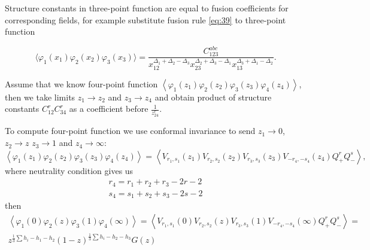 \documentclass[12pt]{article}
\begin{document}
Structure constants in three-point function are equal to fusion coefficients for corresponding
fields, for example substitute fusion rule \eqref{eq:39} to three-point function

  \begin{equation}
    \label{eq:56}
    \langle
    \varphi_{1}(x_{1})\varphi_{2}(x_{2})\varphi_{3}(x_{3})\rangle=\frac{C^{abc}_{123}}{x_{12}^{\Delta_{1}+\Delta_{2}-\Delta_{3}}
      x_{23}^{\Delta_{2}+\Delta_{3}-\Delta_{1}}x_{13}^{\Delta_{3}+\Delta_{1}-\Delta_{2}}}.     
  \end{equation}


Assume that we know four-point function
$\left<\varphi_{1}(z_{1})\varphi_{2}(z_{2})\varphi_{3}(z_{3})\varphi_{4}(z_{4})\right>$, then we
take limits $z_{1}\to z_{2}$ and $z_{3}\to z_{4}$ and obtain product of structure constants
$C_{12}^{r}C_{34}^{r}$ as a coefficient before $\frac{1}{z_{24}^{r}}$.

To compute four-point function we use conformal invariance to send $z_{1}\to 0$, $z_{2}\to z$
$z_{3}\to 1$ and $z_{4}\to \infty$:
\begin{equation}
  \label{eq:58}
  \left<\varphi_{1}(z_{1})\varphi_{2}(z_{2})\varphi_{3}(z_{3})\varphi_{4}(z_{4})\right>=\left<
    V_{r_{1},s_{1}}(z_{1}) V_{r_{2},s_{2}}(z_{2}) V_{r_{3},s_{3}}(z_{3}) V_{-r_{4},-s_{4}}(z_{4})
    Q_{+}^{r} Q_{-}^{s}\right>,
\end{equation}
where neutrality condition gives us
\begin{equation}
  \label{eq:59}
  \begin{array}{c}
    r_{4}=r_{1}+r_{2}+r_{3}-2r-2\\
    s_{4}=s_{1}+s_{2}+s_{3}-2s-2
  \end{array}
\end{equation}
then 
\begin{multline}
  \label{eq:58}
  \left<\varphi_{1}(0)\varphi_{2}(z)\varphi_{3}(1)\varphi_{4}(\infty)\right>=\left<
    V_{r_{1},s_{1}}(0) V_{r_{2},s_{2}}(z) V_{r_{3},s_{3}}(1) V_{-r_{4},-s_{4}}(\infty)
    Q_{+}^{r} Q_{-}^{s}\right>=\\
  z^{\frac{1}{3}\sum h_{i}-h_{1}-h_{2}}(1-z)^{\frac{1}{3}\sum h_{i}-h_{2}-h_{3}} G(z)
\end{multline}
\end{document}
